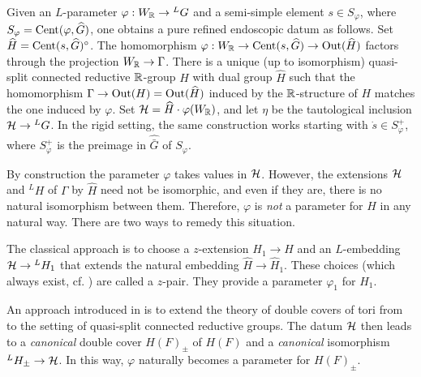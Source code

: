\documentclass{article}
\theoremstyle{definition}
\numberwithin{equation}{section}
\renewcommand{\-}{\hyp{}}
\begin{document}
Given an $L$-parameter $\varphi : W_{\mathbb{R}} \to {^LG}$ and a semi-simple element $s \in S_\varphi$, where $S_\varphi=\textrm{Cent}(\varphi,\widehat G)$, one obtains a pure refined endoscopic datum as follows. Set $\widehat H = \textrm{Cent}(s,\widehat G)^\circ$. The homomorphism  $\varphi : W_{\mathbb{R}} \to \textrm{Cent}(s,\widehat G) \to \textrm{Out}(\widehat H)$ factors through the projection $W_{\mathbb{R}} \to \Gamma$. There is a unique (up to isomorphism) quasi-split connected reductive $\mathbb{R}$-group $H$ with dual group $\hat H$ such that the homomorphism $\Gamma \to \textrm{Out}(H)=\textrm{Out}(\widehat H)$ induced by the $\mathbb{R}$-structure of $H$ matches the one induced by $\varphi$. Set $\mathcal{H}=\widehat H \cdot \varphi(W_{\mathbb{R}})$, and let $\eta$ be the tautological inclusion $\mathcal{H} \to {^LG}$. In the rigid setting, the same construction works starting with $\dot s \in S_\varphi^+$, where $S_\varphi^+$ is the preimage in $\hat{\bar G}$ of $S_\varphi$.

By construction the parameter $\varphi$ takes values in $\mathcal{H}$. However, the extensions $\mathcal{H}$ and $^LH$ of $\Gamma$ by $\hat H$ need not be isomorphic, and even if they are, there is no natural isomorphism between them. Therefore, $\varphi$ is \emph{not} a parameter for $H$ in any natural way. There are two ways to remedy this situation.

The classical approach is to choose a $z$-extension $H_1 \to H$ and an $L$-embedding $\mathcal{H} \to {^LH_1}$ that extends the natural embedding $\hat H \to \hat H_1$. These choices (which always exist, cf. \cite[\S2.2]{KS99}) are called a $z$-pair. They provide a parameter $\varphi_1$ for $H_1$.

An approach introduced in \cite{KalHDC} is to extend the theory of double covers of tori from \cite{KalDC} to the setting of quasi-split connected reductive groups. The datum $\mathcal{H}$ then leads to a \emph{canonical} double cover $H(F)_\pm$ of $H(F)$ and a \emph{canonical} isomorphism $^LH_\pm \to \mathcal{H}$. In this way, $\varphi$ naturally becomes a parameter for $H(F)_\pm$.
\end{document}

